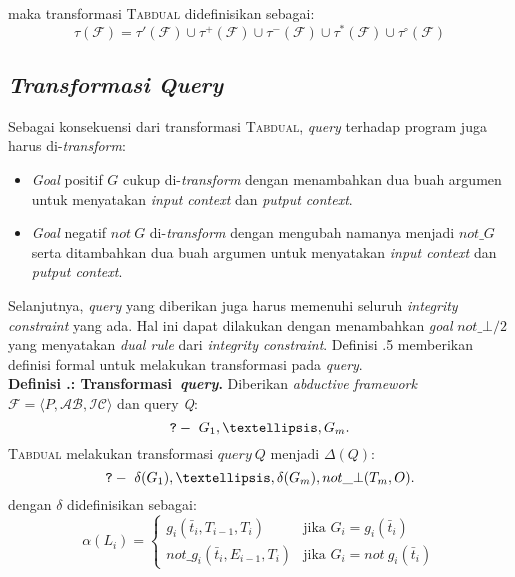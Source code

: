 maka transformasi \textsc{Tabdual} didefinisikan sebagai:
\begin{displaymath}
	\tau(\mathcal{F}) = \tau'(\mathcal{F}) \cup \tau^+(\mathcal{F}) \cup \tau^-(\mathcal{F}) \cup \tau^*(\mathcal{F}) \cup \tau^\circ(\mathcal{F})
\end{displaymath}

\subsection{\textit{Transformasi \textit{Query}}}

Sebagai konsekuensi dari transformasi \textsc{Tabdual}, \textit{query} terhadap program juga harus di-\textit{transform}:

\begin{itemize}
	\item \textit{Goal} positif $G$ cukup di-\textit{transform} dengan menambahkan dua buah argumen untuk menyatakan \textit{input context} dan \textit{putput context}.
	\item \textit{Goal} negatif $not \ G$ di-\textit{transform} dengan mengubah namanya menjadi $not\_G$ serta ditambahkan dua buah argumen untuk menyatakan \textit{input context} dan \textit{putput context}.
\end{itemize}

Selanjutnya, \textit{query} yang diberikan juga harus memenuhi seluruh \textit{integrity constraint} yang ada. Hal ini dapat dilakukan dengan menambahkan \textit{goal} $not\_\bot/2$ yang menyatakan \textit{dual rule} dari \textit{integrity constraint}. Definisi \thebabTigaNum.5 memberikan definisi formal untuk melakukan transformasi pada \textit{query}.
\\

\noindent \textbf{Definisi \thebabTigaNum.\thedefBabTiga: Transformasi\ \textit{query}.} Diberikan \textit{abductive framework} $\mathcal{F} = \langle  P,\mathcal{AB},\mathcal{IC} \rangle$ dan query \textit{Q}:
\begin{displaymath}
	\text{\texttt{?}}- \ G_1, \textellipsis , G_m.
\end{displaymath}
\textsc{Tabdual} melakukan transformasi $query \ Q$ menjadi $\Delta(Q)$:
\begin{displaymath}
	\text{\texttt{?}}- \ \delta(G_1), \textellipsis , \delta(G_m), not\_\bot(T_m,O).
\end{displaymath}
dengan $\delta$ didefinisikan sebagai:
\begin{displaymath}
\alpha(L_i) = 
\begin{cases}
g_i(\bar{t}_i,T_{i-1},T_i) 		& \text{jika $G_i = g_i(\bar{t}_i)$} \\
not\_g_i(\bar{t}_i,E_{i-1},T_i) 	& \text{jika $G_i = not \ g_i(\bar{t}_i)$}
\end{cases}
\end{displaymath}

